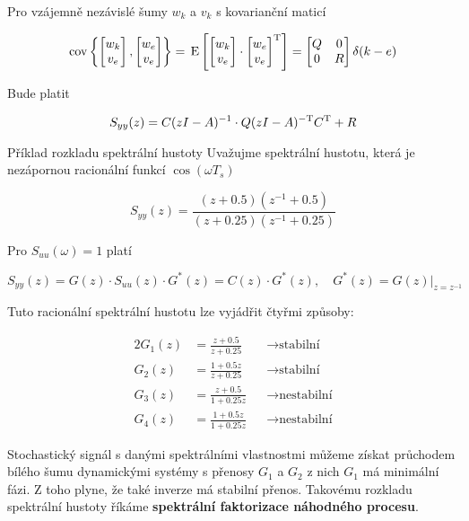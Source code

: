 Pro vzájemně nezávislé šumy $w_k$ a $v_k$ s kovarianční maticí

\[ \mathrm{cov}\left\{ \begin{bmatrix} w_k\\v_e \end{bmatrix}, \begin{bmatrix} w_e\\ v_e \end{bmatrix} \right\} = \,\mathrm{E}\left[\begin{bmatrix} w_k\\v_e \end{bmatrix}\cdot \begin{bmatrix} w_e\\ v_e \end{bmatrix}^{\mathrm{T}}\right] = \begin{bmatrix}
Q & 0 \\ 0 & R
\end{bmatrix}\delta(k-e) \]

Bude platit

\[ S_{yy}(z) = C(zI-A)^{-1}\cdot Q(zI-A)^{-\mathrm{T}}C^{\mathrm{T}} + R \]

\begin{note}{Příklad rozkladu spektrální hustoty}
Uvažujme spektrální hustotu, která je nezápornou racionální funkcí $\cos(\omega T_s)$

\[ S_{yy}(z) = \frac{(z+0.5)(z^{-1}+0.5)}{(z+0.25)(z^{-1}+0.25)} \]

Pro $S_{uu}(\omega) = 1$ platí

\[ S_{yy}(z) = G(z)\cdot S_{uu}(z)\cdot G^*(z) = C(z)\cdot G^*(z),\quad G^*(z)=G(z)|_{z=z^{-1}} \]

Tuto racionální spektrální hustotu lze vyjádřit čtyřmi způsoby:

\begin{alignat*}{2}
G_1(z) & = \frac{z+0.5}{z+0.25} && \to \text{stabilní}\\
G_2(z) & = \frac{1+0.5z}{z+0.25} && \to \text{stabilní}\\
G_3(z) & = \frac{z+0.5}{1+0.25z} && \to \text{nestabilní}\\
G_4(z) & = \frac{1+0.5z}{1+0.25z} && \to \text{nestabilní}
\end{alignat*}

Stochastický signál s danými spektrálními vlastnostmi můžeme získat průchodem bílého šumu dynamickými systémy s přenosy $G_1$ a $G_2$ z nich $G_1$ má minimální fázi. Z toho plyne, že také inverze má stabilní přenos. Takovému rozkladu spektrální hustoty říkáme \textbf{spektrální faktorizace náhodného procesu}.
\end{note}

